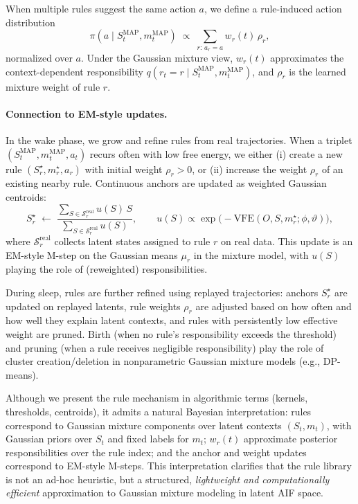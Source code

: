 \documentclass{article} %
\newcommand{\revise}[1]{#1}
\begin{document}
\revise{When multiple rules suggest the same action $a$, we define a rule-induced action distribution
\[
\pi(a \mid S_t^{\mathrm{MAP}}, m_t^{\mathrm{MAP}}) \;\propto\;
\sum_{r:\,a_r = a} w_r(t)\,\rho_r,
\]
normalized over $a$. Under the Gaussian mixture view, $w_r(t)$ approximates the context-dependent responsibility $q(r_t = r \mid S_t^{\mathrm{MAP}},m_t^{\mathrm{MAP}})$, and $\rho_r$ is the learned mixture weight of rule $r$.}
\revise{\paragraph{Connection to EM-style updates.}
In the wake phase, we grow and refine rules from real trajectories. When a triplet $(S_t^{\mathrm{MAP}}, m_t^{\mathrm{MAP}}, a_t)$ recurs often with low free energy, we either (i) create a new rule $(S_r^\star, m_r^\star, a_r)$ with initial weight $\rho_r>0$, or (ii) increase the weight $\rho_r$ of an existing nearby rule. Continuous anchors are updated as weighted Gaussian centroids:
\[
S_r^\star \;\leftarrow\; 
\frac{\sum_{S \in \mathcal S_r^{\mathrm{real}}} u(S)\,S}
     {\sum_{S \in \mathcal S_r^{\mathrm{real}}} u(S)},
\qquad
u(S) \propto \exp\!\big(-\text{VFE}(O,S,m_r^\star;\phi,\vartheta)\big),
\]
where $\mathcal S_r^{\mathrm{real}}$ collects latent states assigned to rule $r$ on real data. This update is an EM-style M-step on the Gaussian means $\mu_r$ in the mixture model, with $u(S)$ playing the role of (reweighted) responsibilities.}

\revise{During sleep, rules are further refined using replayed trajectories: anchors $S_r^\star$ are updated on replayed latents, rule weights $\rho_r$ are adjusted based on how often and how well they explain latent contexts, and rules with persistently low effective weight are pruned. Birth (when no rule’s responsibility exceeds the threshold) and pruning (when a rule receives negligible responsibility) play the role of cluster creation/deletion in nonparametric Gaussian mixture models (e.g., DP-means).}


\revise{Although we present the rule mechanism in algorithmic terms (kernels, thresholds, centroids), it admits a natural Bayesian interpretation: rules correspond to Gaussian mixture components over latent contexts $(S_t,m_t)$, with Gaussian priors over $S_t$ and fixed labels for $m_t$; $w_r(t)$ approximate posterior responsibilities over the rule index; and the anchor and weight updates correspond to EM-style M-steps. This interpretation clarifies that the rule library is not an ad-hoc heuristic, but a structured, \emph{lightweight and computationally efficient} approximation to Gaussian mixture modeling in latent AIF space.}
\end{document}
